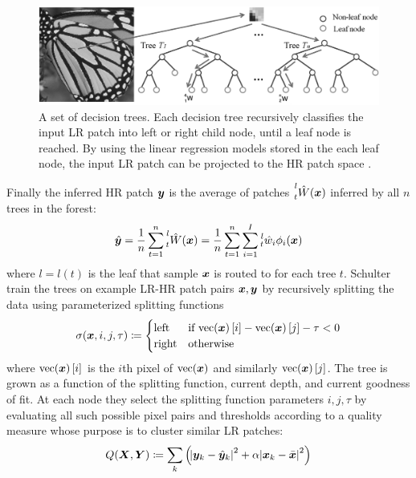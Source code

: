 \begin{figure}[!htbp]
    \centering
    \includegraphics[width=\linewidth,keepaspectratio]{figures/classical/FIRF.png}
    \caption{A set of decision trees. Each decision tree recursively classifies the input LR patch into left or right child node, until a leaf node is reached. By using the linear regression models stored in the each leaf node, the input LR patch can be projected to the HR patch space \cite{Huang}.}
    \label{fig:firf}
\end{figure}
%
Finally the inferred HR patch \(\bm{y}\) is the average of patches \(\prescript{l}{t}{\hat{W}(\bm{x})}\) inferred by all \(n\) trees in the forest:
\begin{equation}
    \hat{\bm{y}} = \frac{1}{n} \sum_{t=1}^{n} \prescript{l}{t}{\hat{W}(\bm{x})} =  \frac{1}{n} \sum_{t=1}^{n} \sum_{i=1}^I \prescript{l}{t}{\hat{w}_i}\phi_i(\bm{x})
\end{equation}
where \(l = l(t)\) is the leaf that sample \(\bm{x}\) is routed to for each tree \(t\).
%
Schulter \etal train the trees on example LR-HR patch pairs \(\bm{x}, \bm{y}\) by recursively splitting the data using parameterized splitting functions
\begin{equation}
    \sigma(\bm{x}, i, j, \tau)\coloneqq {
        \begin{cases}
            \text{left}  & \text{if } \text{vec}(\bm{x})\left[ i \right] - \text{vec}(\bm{x})\left[ j \right] - \tau < 0 \\
            \text{right} & \text{otherwise}
        \end{cases}
    }
\end{equation}
where \(\text{vec}(\bm{x})\left[ i \right]\) is the \(i\)th pixel of \(\text{vec}(\bm{x})\) and similarly \(\text{vec}(\bm{x})\left[ j \right]\).
%
The tree is grown as a function of the splitting function, current depth, and current goodness of fit.
%
At each node they select the splitting function parameters \(i, j, \tau\) by evaluating all such possible pixel pairs and thresholds according to a quality measure whose purpose is to cluster similar LR patches:
\begin{equation}
    Q(\bX, \bY) \coloneqq \sum_k \left( \abs{ \by_k - \hat{\by}_k }^2 + \alpha\abs{ \bx_k - \bar{\bx} }^2 \right)
    \label{eqn:qualitymeasure}
\end{equation}
